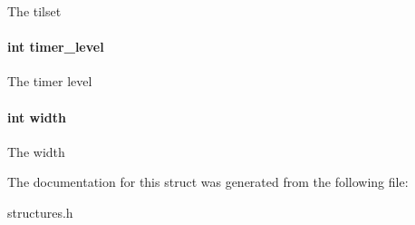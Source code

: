 The tilset \hypertarget{struct_level_a28c59da9677a9d7b98db49328a77dc3c}{
\paragraph[{timer\-\_\-level}]{\setlength{\rightskip}{0pt plus 5cm}int timer\-\_\-level}}\label{struct_level_a28c59da9677a9d7b98db49328a77dc3c}
The timer level \hypertarget{struct_level_a2474a5474cbff19523a51eb1de01cda4}{
\paragraph[{width}]{\setlength{\rightskip}{0pt plus 5cm}int width}}\label{struct_level_a2474a5474cbff19523a51eb1de01cda4}
The width 

The documentation for this struct was generated from the following file\-:\begin{DoxyCompactItemize}
\item 
structures.\-h\end{DoxyCompactItemize}
